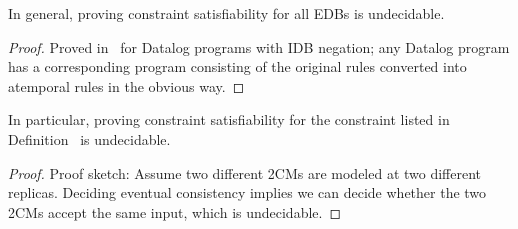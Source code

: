
\begin{lemma}
In general, proving constraint satisfiability for all EDBs is undecidable.
\end{lemma}
\begin{proof}
Proved in~\cite{qs-datalog} for Datalog programs with IDB negation; any Datalog program has a corresponding \lang program consisting of the original rules converted into atemporal \lang rules in the obvious way.
\end{proof}

\begin{lemma}
In particular, proving constraint satisfiability for the constraint listed in Definition~\label{def:ec} is undecidable.
\end{lemma}
\begin{proof}
Proof sketch: Assume two different 2CMs are modeled at two different replicas.  Deciding eventual consistency implies we can decide whether the two 2CMs accept the same input, which is undecidable.
\end{proof}


%



